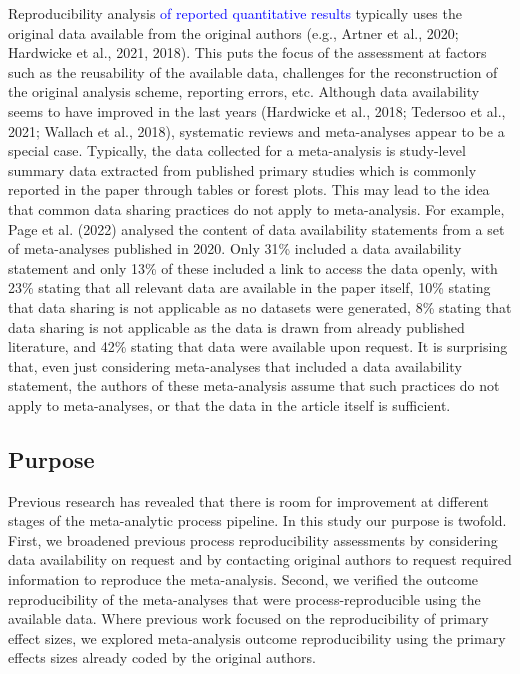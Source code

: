 \documentclass[
  ,man,floatsintext]{apa6}
\begin{document}
Reproducibility analysis \textcolor{blue}{of reported quantitative results} typically uses the original data available from the original authors (e.g., Artner et al., 2020; Hardwicke et al., 2021, 2018). This puts the focus of the assessment at factors such as the reusability of the available data, challenges for the reconstruction of the original analysis scheme, reporting errors, etc. Although data availability seems to have improved in the last years (Hardwicke et al., 2018; Tedersoo et al., 2021; Wallach et al., 2018), systematic reviews and meta-analyses appear to be a special case. Typically, the data collected for a meta-analysis is study-level summary data extracted from published primary studies which is commonly reported in the paper through tables or forest plots. This may lead to the idea that common data sharing practices do not apply to meta-analysis. For example, Page et al. (2022) analysed the content of data availability statements from a set of meta-analyses published in 2020. Only 31\% included a data availability statement and only 13\% of these included a link to access the data openly, with 23\% stating that all relevant data are available in the paper itself, 10\% stating that data sharing is not applicable as no datasets were generated, 8\% stating that data sharing is not applicable as the data is drawn from already published literature, and 42\% stating that data were available upon request. It is surprising that, even just considering meta-analyses that included a data availability statement, the authors of these meta-analysis assume that such practices do not apply to meta-analyses, or that the data in the article itself is sufficient.

\hypertarget{purpose}{%
\subsection{Purpose}\label{purpose}}

Previous research has revealed that there is room for improvement at different stages of the meta-analytic process pipeline. In this study our purpose is twofold. First, we broadened previous process reproducibility assessments by considering data availability on request and by contacting original authors to request required information to reproduce the meta-analysis. Second, we verified the outcome reproducibility of the meta-analyses that were process-reproducible using the available data. Where previous work focused on the reproducibility of primary effect sizes, we explored meta-analysis outcome reproducibility using the primary effects sizes already coded by the original authors.
\end{document}
